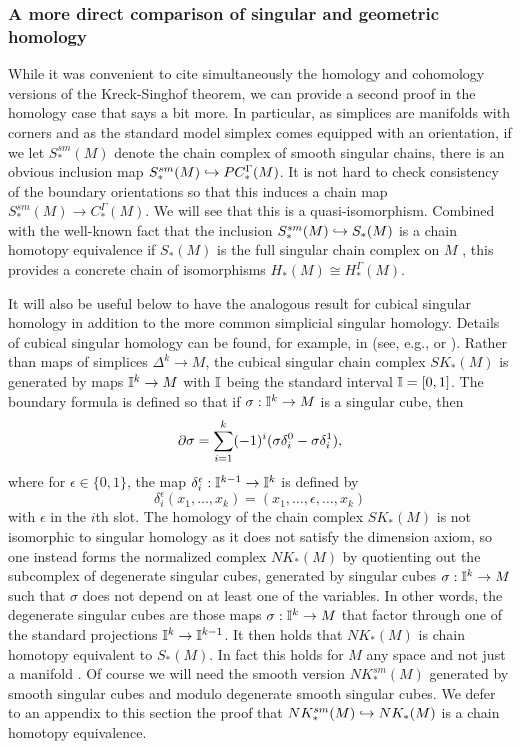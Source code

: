 \subsubsection{A more direct comparison of singular and geometric homology}

While it was convenient to cite simultaneously the homology and cohomology versions of the Kreck-Singhof theorem, we can provide a second proof in the homology case that says a bit more. In particular, as simplices are manifolds with corners and as the standard model simplex comes equipped with an orientation, if we let $S^{sm}_*(M)$ denote the chain complex of smooth singular chains, there is an obvious inclusion map $S^{sm}_*(M)\hookrightarrow PC_*^\Gamma(M)$. It is not hard to check consistency of the boundary orientations so that this induces a chain map $S^{sm}_*(M) \to C_*^\Gamma(M)$. We will see that this is a quasi-isomorphism. Combined with the well-known fact that the inclusion $S^{sm}_*(M)\hookrightarrow S_*(M)$ is a chain homotopy equivalence if $S_*(M)$ is the full singular chain complex on $M$ \cite[Theorem 18.7]{Lee13}, this provides a concrete chain of isomorphisms $H_*(M)\cong H_*^\Gamma(M)$.

It will also be useful below to have the analogous result for cubical singular homology in addition to the more common simplicial singular homology. Details of cubical singular homology can be found, for example, in (see, e.g., \cite{Mas91} or \cite[Section 8.3]{HW60}). Rather than maps of simplices $\Delta^k \to M$, the cubical singular chain complex $SK_*(M)$ is generated by maps $\mathbb{I}^k \to M$ with $\mathbb{I}$ being the standard interval $\mathbb{I} = [0,1]$. The boundary formula is defined so that if $\sigma: \mathbb{I}^k \to M$ is a singular cube, then
\begin{equation}\label{E: cube bd}
\partial \sigma = \sum_{i = 1}^k (-1)^i(\sigma \delta_i^0-\sigma \delta^1_i),
\end{equation}
where for $\epsilon\in\{0,1\}$, the map $\delta_i^\epsilon:\mathbb{I}^{k-1} \to \mathbb{I}^k$ is defined by
$$\delta_i^\epsilon(x_1,\ldots,x_k) = (x_1,\ldots,\epsilon,\ldots, x_k)$$
with $\epsilon$ in the $i$th slot. The homology of the chain complex $SK_*(M)$ is not isomorphic to singular homology as it does not satisfy the dimension axiom, so one instead forms the normalized complex $NK_*(M)$ by quotienting out the subcomplex of degenerate singular cubes, generated by singular cubes $\sigma:\mathbb{I}^k \to M$ such that $\sigma$ does not depend on at least one of the variables. In other words, the degenerate singular cubes are those maps $\sigma:\mathbb{I}^k \to M$ that factor through one of the standard projections $\mathbb{I}^k \to \mathbb{I}^{k-1}$. It then holds that $NK_*(M)$ is chain homotopy equivalent to $S_*(M)$. In fact this holds for $M$ any space and not just a manifold \cite[Theorem 8.4.7]{HW60}. Of course we will need the smooth version $NK^{sm}_*(M)$ generated by smooth singular cubes and modulo degenerate smooth singular cubes. We defer to an appendix to this section the proof that $NK^{sm}_*(M)\hookrightarrow NK_*(M)$ is a chain homotopy equivalence.




